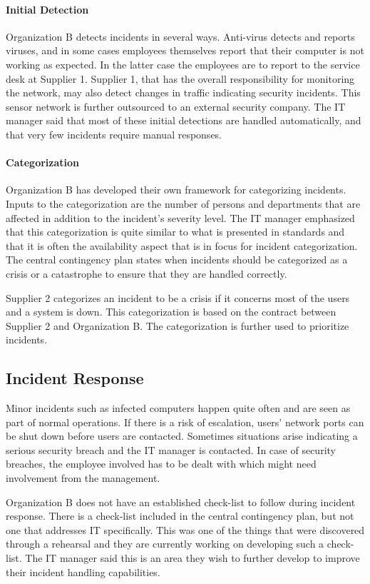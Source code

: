 \paragraph{Initial Detection}
Organization B detects incidents in several ways. Anti-virus detects and reports viruses, and in some cases employees themselves report that their computer is not working as expected. In the latter case the employees are to report to the service desk at Supplier 1. Supplier 1, that has the overall responsibility for monitoring the network, may also detect changes in traffic indicating security incidents. This sensor network is further outsourced to an external security company. The IT manager said that most of these initial detections are handled automatically, and that very few incidents require manual responses. 

\paragraph{Categorization}
Organization B has developed their own framework for categorizing incidents. Inputs to the categorization are the number of persons and departments that are affected in addition to the incident's severity level. The IT manager emphasized that this categorization is quite similar to what is presented in standards and that it is often the availability aspect that is in focus for incident categorization. The central contingency plan states when incidents should be categorized as a crisis or a catastrophe to ensure that they are handled correctly.

Supplier 2 categorizes an incident to be a crisis if it concerns most of the users and a system is down. This categorization is based on the contract between Supplier 2 and Organization B. The categorization is further used to prioritize incidents.

\subsection{Incident Response}
Minor incidents such as infected computers happen quite often and are seen as part of normal operations. If there is a risk of escalation, users' network ports can be shut down before users are contacted. Sometimes situations arise indicating a serious security breach and the IT manager is contacted. In case of security breaches, the employee involved has to be dealt with which might need involvement from the management.

Organization B does not have an established check-list to follow during incident response. There is a check-list included in the central contingency plan, but not one that addresses IT specifically. This was one of the things that were discovered through a rehearsal and they are currently working on developing such a check-list. The IT manager said this is an area they wish to further develop to improve their incident handling capabilities. 

